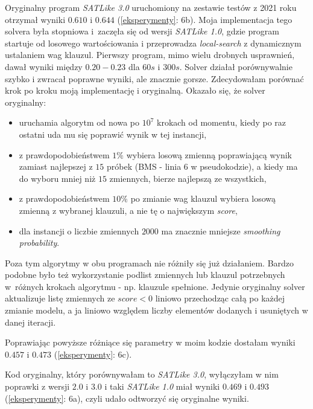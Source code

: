 \documentclass[shortabstract]{iithesis}
\begin{document}
Oryginalny program \textit{SATLike 3.0} uruchomiony na zestawie testów z 2021 roku otrzymał wyniki $0.610$ i $0.644$ (\ref{eksperymenty}: 6b). 
Moja implementacja tego solvera była stopniowa i~zaczęła się od wersji \textit{SATLike 1.0}, gdzie program startuje od losowego wartościowania i przeprowadza \textit{local-search} z dynamicznym ustalaniem wag klauzul. Pierwszy program, mimo wielu drobnych usprawnień, dawał wyniki między $0.20-0.23$ dla $60s$ i $300s$. Solver działał porównywalnie szybko i zwracał poprawne wyniki, ale znacznie gorsze. Zdecydowałam porównać krok po kroku moją implementację i oryginalną. Okazało się, że solver oryginalny:
\begin{itemize}
	\item uruchamia algorytm od nowa po $10^7$ krokach od momentu, kiedy po raz ostatni uda mu się poprawić wynik w tej instancji,
	\item z prawdopodobieństwem $1\%$ wybiera losową zmienną poprawiającą wynik zamiast najlepszej z $15$ próbek (BMS - linia 6 w pseudokodzie), a kiedy ma do wyboru mniej niż $15$ zmiennych, bierze najlepszą ze wszystkich,
	\item z prawdopodobieństwem $10\%$ po zmianie wag klauzul wybiera losową zmienną z wybranej klauzuli, a nie tę o największym \textit{score},
	\item dla instancji o liczbie zmiennych $2000$ ma znacznie mniejsze \textit{smoothing probability}.
\end{itemize}
	
Poza tym algorytmy w obu programach nie różniły się już działaniem. Bardzo podobne było też wykorzystanie podlist zmiennych lub klauzul potrzebnych w~różnych krokach algorytmu - np. klauzule spełnione.
Jedynie oryginalny solver aktualizuje listę zmiennych ze $score < 0$ liniowo przechodząc całą po każdej zmianie modelu, a ja liniowo względem liczby elementów dodanych i usuniętych w danej iteracji.

Poprawiając powyższe różniące się parametry w moim kodzie dostałam wyniki $0.457$ i $0.473$ (\ref{eksperymenty}: 6c).

Kod oryginalny, który porównywałam to \textit{SATLike 3.0}, wyłączyłam w nim poprawki z wersji $2.0$ i $3.0$ i taki \textit{SATLike 1.0} miał wyniki $0.469$ i $0.493$ (\ref{eksperymenty}: 6a), czyli udało odtworzyć się oryginalne wyniki.
\end{document}
